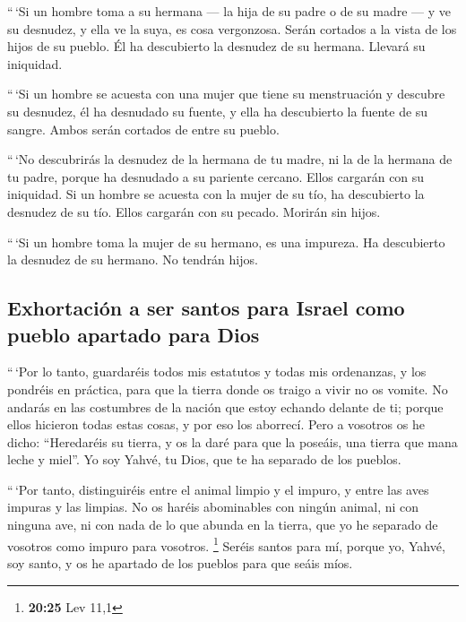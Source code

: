 \begin{paracol}{2}
 ``\,`Si un hombre toma a su hermana --- la hija de su
padre o de su madre --- y ve su desnudez, y ella ve la suya, es cosa
vergonzosa. Serán cortados a la vista de los hijos de su pueblo. Él ha
descubierto la desnudez de su hermana. Llevará su iniquidad.

 ``\,`Si un hombre se acuesta con una mujer que tiene su
menstruación y descubre su desnudez, él ha desnudado su fuente, y ella
ha descubierto la fuente de su sangre. Ambos serán cortados de entre su
pueblo.

 ``\,`No descubrirás la desnudez de la hermana de tu
madre, ni la de la hermana de tu padre, porque ha desnudado a su
pariente cercano. Ellos cargarán con su iniquidad.  Si un
hombre se acuesta con la mujer de su tío, ha descubierto la desnudez de
su tío. Ellos cargarán con su pecado. Morirán sin hijos.

 ``\,`Si un hombre toma la mujer de su hermano, es una
impureza. Ha descubierto la desnudez de su hermano. No tendrán hijos.

\hypertarget{exhortaciuxf3n-a-ser-santos-para-israel-como-pueblo-apartado-para-dios}{%
\subsection{Exhortación a ser santos para Israel como pueblo apartado
para
Dios}\label{exhortaciuxf3n-a-ser-santos-para-israel-como-pueblo-apartado-para-dios}}

 ``\,`Por lo tanto, guardaréis todos mis estatutos y
todas mis ordenanzas, y los pondréis en práctica, para que la tierra
donde os traigo a vivir no os vomite.  No andarás en las
costumbres de la nación que estoy echando delante de ti; porque ellos
hicieron todas estas cosas, y por eso los aborrecí.  Pero
a vosotros os he dicho: ``Heredaréis su tierra, y os la daré para que la
poseáis, una tierra que mana leche y miel''. Yo soy Yahvé, tu Dios, que
te ha separado de los pueblos.

 ``\,`Por tanto, distinguiréis entre el animal limpio y
el impuro, y entre las aves impuras y las limpias. No os haréis
abominables con ningún animal, ni con ninguna ave, ni con nada de lo que
abunda en la tierra, que yo he separado de vosotros como impuro para
vosotros. \footnote{\textbf{20:25} Lev 11,1}  Seréis
santos para mí, porque yo, Yahvé, soy santo, y os he apartado de los
pueblos para que seáis míos.


\end{paracol}
